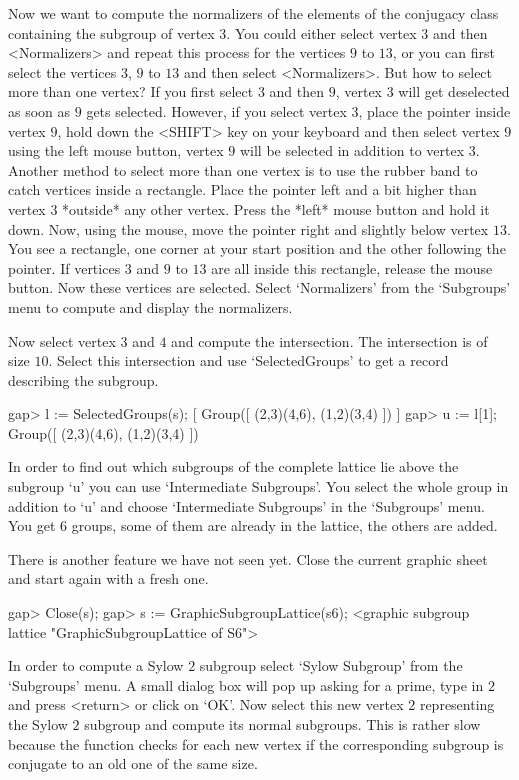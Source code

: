 Now we want to compute the normalizers of the elements of the conjugacy
class containing the subgroup of vertex $3$.  You could either select
vertex $3$ and then <Normalizers> and repeat this process for the vertices
$9$ to $13$, or you can first select the vertices $3$, $9$ to $13$ and then
select <Normalizers>.  But how to select more than one vertex?  If you
first select $3$ and then $9$, vertex $3$ will get deselected as soon as
$9$ gets selected.  However, if you select vertex $3$, place the pointer
inside vertex $9$, hold down the <SHIFT> key on your keyboard and then
select vertex $9$ using the left mouse button, vertex $9$ will be selected
in addition to vertex $3$.  Another method to select more than one vertex
is to use the rubber band to catch vertices inside a rectangle.  Place the
pointer left and a bit higher than vertex $3$ *outside* any other vertex.
Press the *left* mouse button and hold it down.  Now, using the mouse, move
the pointer right and slightly below vertex $13$.  You see a rectangle, one
corner at your start position and the other following the pointer.  If
vertices $3$ and $9$ to $13$ are all inside this rectangle, release the
mouse button.  Now these vertices are selected.  Select `Normalizers' from
the `Subgroups' menu to compute and display the normalizers.

Now select vertex $3$ and $4$ and compute the intersection.  The
intersection is of size $10$.  Select this intersection and use
`SelectedGroups' to get a {\GAP} record describing the subgroup.

\begintt
gap> l := SelectedGroups(s);
[ Group([ (2,3)(4,6), (1,2)(3,4) ]) ]
gap> u := l[1];
Group([ (2,3)(4,6), (1,2)(3,4) ])
\endtt

In order  to find out which subgroups  of the complete lattice  lie above
the subgroup `u' you can  use `Intermediate Subgroups'. You select the
whole group in addition to `u' and choose `Intermediate Subgroups' in the 
`Subgroups' menu. You get 6 groups, some of them are already in the
lattice, the others are added.

There is another feature we have not seen yet.  Close the current graphic
sheet and start again with a fresh one.

\begintt
gap> Close(s);
gap> s := GraphicSubgroupLattice(s6);
<graphic subgroup lattice "GraphicSubgroupLattice of S6">
\endtt

In order to compute a Sylow $2$ subgroup select `Sylow Subgroup' from the
`Subgroups' menu.   A small dialog box  will  pop up asking  for a prime,
type in  $2$ and press <return> or  click on `OK'.   Now select  this new
vertex $2$   representing the Sylow $2$  subgroup  and compute its normal
subgroups.  This is rather slow because the  function checks for each new
vertex if the corresponding  subgroup is conjugate to  an old one  of the
same size.  


